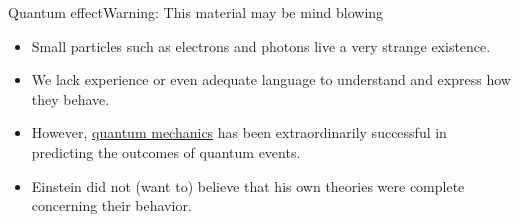 \begin{frame}{Quantum effect}{Warning:  This material may be mind blowing}
\begin{itemize}
    \item Small particles such as electrons and photons live a very strange existence.
    \item We lack experience or even adequate language to understand and express how they behave.
    \item However, \href{https://en.wikipedia.org/wiki/Quantum_mechanics}{quantum mechanics} has been extraordinarily successful in predicting the outcomes of quantum events.
    \item Einstein did not (want to) believe that his own theories were complete concerning their behavior.
\end{itemize}


\end{frame}
